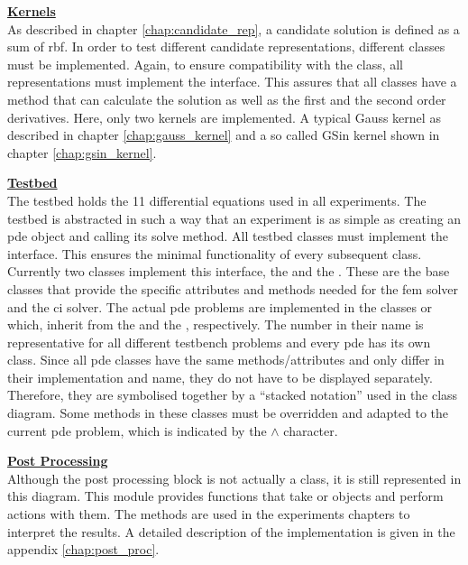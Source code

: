 \documentclass[./\jobname.tex]{subfiles}
\begin{document}
\large \underline{\textbf{Kernels}} \\
As described in chapter \ref{chap:candidate_rep}, a candidate solution is defined as a sum of \gls{rbf}. In order to test different candidate representations, different classes must be implemented. Again, to ensure compatibility with the  class, all representations must implement the  interface. This assures that all classes have a method that can calculate the solution as well as the first and the second order derivatives. Here, only two kernels are implemented. A typical Gauss kernel as described in chapter \ref{chap:gauss_kernel} and a so called GSin kernel shown in chapter \ref{chap:gsin_kernel}. 

\large \underline{\textbf{Testbed}} \\
The testbed holds the 11 differential equations used in all experiments. The testbed is abstracted in such a way that an experiment is as simple as creating an \gls{pde} object and calling its solve method. All testbed classes must implement the  interface. This ensures the minimal functionality of every subsequent class. Currently two classes implement this interface, the  and the . These are the base classes that provide the specific attributes and methods needed for the \gls{fem} solver and the \gls{ci} solver. The actual \gls{pde} problems are implemented in the classes  or  which, inherit from the  and the , respectively. The number in their name is representative for all different testbench problems and every \gls{pde} has its own class. Since all \gls{pde} classes have the same methods/attributes and only differ in their implementation and name, they do not have to be displayed separately. Therefore, they are symbolised together by a ``stacked notation'' used in the class diagram. Some methods in these classes must be overridden and adapted to the current \gls{pde} problem, which is indicated by the $\land$ character.

\large \underline{\textbf{Post Processing}} \\
Although the post processing block is not actually a class, it is still represented in this diagram. This module provides functions that take  or  objects and perform actions with them. The methods are used in the experiments chapters to interpret the results. A detailed description of the implementation is given in the appendix \ref{chap:post_proc}.
\end{document}
